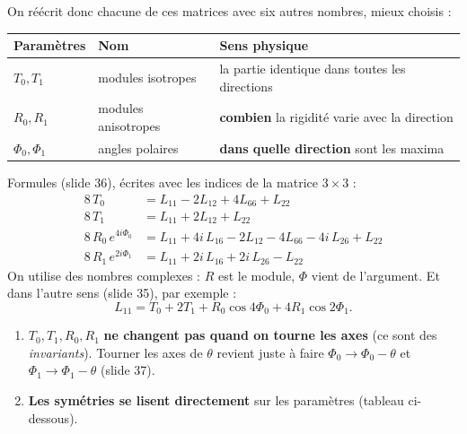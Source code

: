 \documentclass[11pt,a4paper]{article}
\begin{document}
On réécrit donc chacune de ces matrices avec six autres nombres, mieux
choisis :
\begin{center}
\begin{tabularx}{\linewidth}{l l X}
\toprule
Paramètres & Nom & Sens physique\\
\midrule
$T_0, T_1$ & modules isotropes & la partie identique dans toutes les directions\\
$R_0, R_1$ & modules anisotropes & \textbf{combien} la rigidité varie avec la direction\\
$\Phi_0, \Phi_1$ & angles polaires & \textbf{dans quelle direction} sont les maxima\\
\bottomrule
\end{tabularx}
\end{center}
Formules (slide 36), écrites avec les indices de la matrice $3\times3$ :
\begin{align*}
8\,T_0 &= L_{11} - 2L_{12} + 4L_{66} + L_{22}\\
8\,T_1 &= L_{11} + 2L_{12} + L_{22}\\
8\,R_0\,e^{4i\Phi_0} &= L_{11} + 4i\,L_{16} - 2L_{12} - 4L_{66} - 4i\,L_{26} + L_{22}\\
8\,R_1\,e^{2i\Phi_1} &= L_{11} + 2i\,L_{16} + 2i\,L_{26} - L_{22}
\end{align*}
On utilise des nombres complexes : $R$ est le module, $\Phi$ vient de
l'argument. Et dans l'autre sens (slide 35), par exemple :
\[
L_{11} = T_0 + 2T_1 + R_0\cos 4\Phi_0 + 4R_1\cos 2\Phi_1 .
\]

\begin{idee}
\begin{enumerate}
  \item $T_0, T_1, R_0, R_1$ \textbf{ne changent pas quand on tourne les
        axes} (ce sont des \emph{invariants}). Tourner les axes de $\theta$
        revient juste à faire $\Phi_0 \to \Phi_0-\theta$ et
        $\Phi_1 \to \Phi_1-\theta$ (slide 37).
  \item \textbf{Les symétries se lisent directement} sur les paramètres
        (tableau ci-dessous).
\end{enumerate}
\end{idee}
\end{document}
